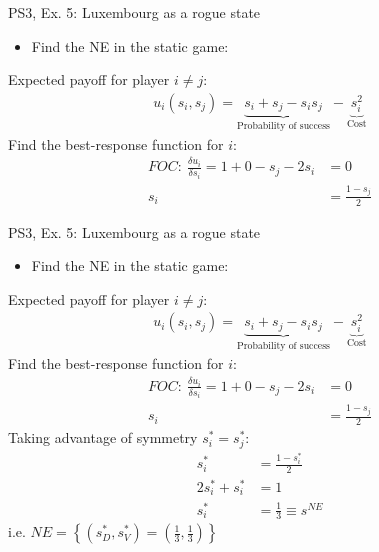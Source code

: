 \begin{frame}{PS3, Ex. 5: Luxembourg as a rogue state}
  \begin{multicols}{2}
    \begin{itemize}
      \item[(a)] Find the NE in the static game:
    \end{itemize}
    Expected payoff for player $i\neq j$:
    \begin{align*}
      u_i(s_i,s_j)=\underbrace{s_i+s_j-s_is_j}_\text{Probability of success}-\underbrace{s_i^2}_\text{Cost}
    \end{align*}
    Find the best-response function for $i$:
    \begin{align*}
      FOC:\ \frac{\delta u_i}{\delta s_i}=1+0-s_j-2s_i&=0\\
       s_i&=\frac{1-s_j}{2}
    \end{align*}
  \vfill\null\columnbreak
  \vfill\null
  \end{multicols}
\end{frame}
\begin{frame}{PS3, Ex. 5: Luxembourg as a rogue state}
  \begin{multicols}{2}
    \begin{itemize}
      \item[(a)] Find the NE in the static game:
    \end{itemize}
    Expected payoff for player $i\neq j$:
    \begin{align*}
      u_i(s_i,s_j)=\underbrace{s_i+s_j-s_is_j}_\text{Probability of success}-\underbrace{s_i^2}_\text{Cost}
    \end{align*}
    Find the best-response function for $i$:
    \begin{align*}
      FOC:\ \frac{\delta u_i}{\delta s_i}=1+0-s_j-2s_i&=0\\
       s_i&=\frac{1-s_j}{2}
    \end{align*}
    Taking advantage of symmetry $s_i^{*}=s_j^{*}$:
    \begin{align*}
       s_i^{*}&=\frac{1-s_i^{*}}{2}\\
      2s_i^{*}+s_i^{*}&=1\\
       s_i^{*}&=\frac{1}{3}\equiv s^{NE}
    \end{align*}
    i.e. $NE=\left\{(s_D^{*},s_V^{*})=(\frac{1}{3},\frac{1}{3})\right\}$
  \vfill\null\columnbreak
  \vfill\null
  \end{multicols}
\end{frame}
